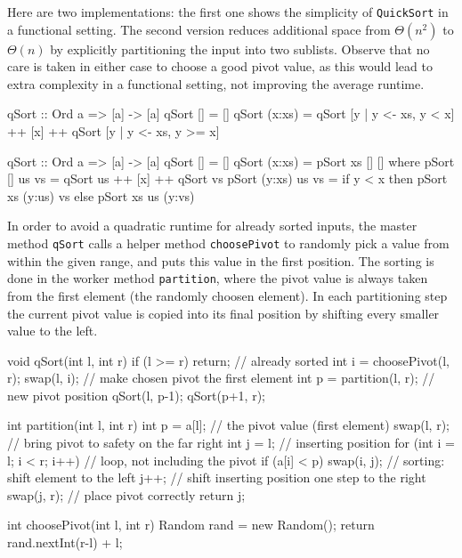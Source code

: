 \begin{impl} \label{impl:qshaskell}
Here are two implementations: the first one shows the simplicity of \texttt{QuickSort} in a functional setting.
The second version reduces additional space from $\Theta (n^2)$ to $\Theta (n)$ by explicitly partitioning the input into two sublists.
Observe that no care is taken in either case to choose a good pivot value, as this would lead to extra complexity in a functional setting, not improving the average runtime.
\end{impl}

\begin{haskellcode}
  qSort :: Ord a => [a] -> [a]
  qSort [] = []
  qSort (x:xs) = qSort [y | y <- xs, y < x] ++ [x] ++
                 qSort [y | y <- xs, y >= x]

  qSort :: Ord a => [a] -> [a]
  qSort [] = []
  qSort (x:xs) = pSort xs [] []
      where
      pSort [] us vs = qSort us ++ [x] ++ qSort vs
      pSort (y:xs) us vs = if y < x
                           then pSort xs (y:us) vs
                           else pSort xs us (y:vs)
\end{haskellcode}

\begin{impl}
In order to avoid a quadratic runtime for already sorted inputs, the master method \texttt{qSort} calls a helper method \texttt{choosePivot} to randomly pick a value from within the given range, and puts this value in the first position.
The sorting is done in the worker method \texttt{partition}, where the pivot value is always taken from the first element (the randomly choosen element).
In each partitioning step the current pivot value is copied into its final position by shifting every smaller value to the left.
\end{impl}

\begin{javacode}
void qSort(int l, int r) {
    if (l >= r) return; // already sorted
    int i = choosePivot(l, r);
    swap(l, i); // make chosen pivot the first element
    int p = partition(l, r); // new pivot position
    qSort(l, p-1);
    qSort(p+1, r);
}

int partition(int l, int r) {
    int p = a[l]; // the pivot value (first element)
    swap(l, r); // bring pivot to safety on the far right
    int j = l; // inserting position
    for (int i = l; i < r; i++) { // loop, not including the pivot
        if (a[i] < p) {
            swap(i, j); // sorting: shift element to the left
            j++; // shift inserting position one step to the right
        }
    }
    swap(j, r); // place pivot correctly
    return j;
}

int choosePivot(int l, int r) {
    Random rand = new Random();
    return rand.nextInt(r-l) + l;
}
\end{javacode}

